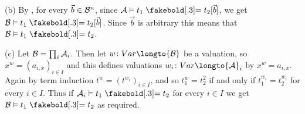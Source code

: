 (b) By , for every $\vec b\in{\cal B}^n$, since ${\cal A}\vDash t_1\eq t_2[\vec b]$, we get ${\cal B}\vDash t_1\eq t_2[\vec b]$.
Since $\vec b$ is arbitrary this means that ${\cal B}\vDash t_1\eq t_2$.

(c) Let ${\cal B}=\prod_i{\cal A}_i$.
Then let $w\colon\Var\longto{\cal B}$ be a valuation, so $x^w=(a_{i,x})_{i\in I}$ and this defines valuations $w_i\colon\Var\longto{\cal A}_i$ by $x^w=a_{i,x}$.
Again by term induction $t^w=(t^{w_i})_{i\in I}$, and so $t_1^w=t_2^2$ if and only if $t_1^{w_i}=t_2^{w_i}$ for every $i\in I$.
Thus if ${\cal A}_i\vDash t_1\eq t_2$ for every $i\in I$ we get ${\cal B}\vDash t_1\eq t_2$ as required.

